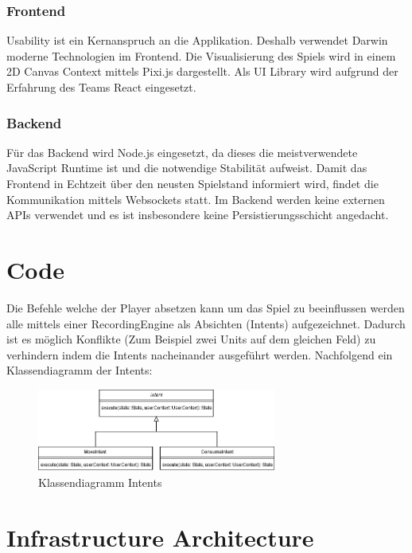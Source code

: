 \documentclass[a4paper, 11pt]{scrartcl}
\let\oldsection\section
\renewcommand\section{\clearpage\oldsection}
\begin{document}
\subsubsection{Frontend}
Usability ist ein Kernanspruch an die Applikation. Deshalb verwendet Darwin moderne Technologien im Frontend.
Die Visualisierung des Spiels wird in einem 2D Canvas Context mittels Pixi.js dargestellt.
Als UI Library wird aufgrund der Erfahrung des Teams React eingesetzt.

\subsubsection{Backend}
Für das Backend wird Node.js eingesetzt, da dieses die meistverwendete JavaScript Runtime ist und die notwendige Stabilität aufweist.
Damit das Frontend in Echtzeit über den neusten Spielstand informiert wird, findet die Kommunikation mittels Websockets statt.
Im Backend werden keine externen APIs verwendet und es ist insbesondere keine Persistierungsschicht angedacht.

\section{Code}
Die Befehle welche der Player absetzen kann um das Spiel zu beeinflussen werden alle mittels einer RecordingEngine als Absichten (Intents) aufgezeichnet.
Dadurch ist es möglich Konflikte (Zum Beispiel zwei Units auf dem gleichen Feld) zu verhindern indem die Intents nacheinander ausgeführt werden.
Nachfolgend ein Klassendiagramm der Intents:
\begin{figure}[h]
  \caption{Klassendiagramm Intents}
  \centering
  \includegraphics[width=0.7\textwidth]{./img/Intent}
\end{figure}


\section{Infrastructure Architecture}
\end{document}
